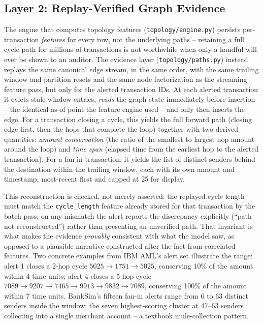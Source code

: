 \subsection{Layer 2: Replay-Verified Graph Evidence}
The engine that computes topology features (\texttt{topology/engine.py})
persists per-transaction \emph{features} for every row, not the underlying
paths -- retaining a full cycle path for millions of transactions is not
worthwhile when only a handful will ever be shown to an auditor. The
evidence layer (\texttt{topology/paths.py}) instead replays the same
canonical edge stream, in the same order, with the same trailing window and
partition resets and the same node factorization as the streaming feature
pass, but only for the alerted transaction IDs. At each alerted transaction
it evicts stale window entries, \emph{reads} the graph state immediately
before insertion -- the identical as-of point the feature engine used -- and
only then inserts the edge. For a transaction closing a cycle, this yields
the full forward path (closing edge first, then the hops that complete the
loop) together with two derived quantities: \emph{amount conservation}
(the ratio of the smallest to largest hop amount around the loop) and
\emph{time span} (elapsed time from the earliest hop to the alerted
transaction). For a fan-in transaction, it yields the list of distinct
senders behind the destination within the trailing window, each with its
own amount and timestamp, most-recent first and capped at 25 for display.

This reconstruction is checked, not merely asserted: the replayed cycle
length must match the \texttt{cycle\_length} feature already stored for that
transaction by the batch pass; on any mismatch the alert reports the
discrepancy explicitly (``path not reconstructed'') rather than presenting an
unverified path. That invariant is what makes the evidence \emph{provably}
consistent with what the model saw, as opposed to a plausible narrative
constructed after the fact from correlated features. Two concrete examples
from IBM AML's alert set illustrate the range: alert 1 closes a 2-hop cycle
$5025 \to 1751 \to 5025$, conserving 10\% of the amount within 4 time units;
alert 4 closes a 5-hop cycle $7089 \to 9207 \to 7465 \to 9913 \to 9832 \to
7089$, conserving 100\% of the amount within 7 time units. BankSim's fifteen
fan-in alerts range from 6 to 63 distinct senders inside the window; the
seven highest-scoring cluster at 47--63 senders collecting into a single
merchant account -- a textbook mule-collection pattern.

